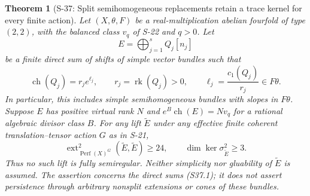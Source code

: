 \documentclass[11pt,a4paper]{article}
\newtheorem{theorem}{Theorem}[section]
\theoremstyle{definition}
\begin{document}
\begin{theorem}[S-37: Split semihomogeneous replacements retain a trace kernel for every finite action]
\label{thm:semireg-rm-split-semihomogeneous}
Let $(X,\theta,F)$ be a real-multiplication abelian
fourfold of type $(2,2)$, with the balanced class $v_q$
of S-22 and $q>0$. Let
\[
 E=\bigoplus_{j=1}^{s}Q_j[n_j]
 \tag{S37.1}
\]
be a finite direct sum of shifts of simple vector bundles
such that
\[
 \operatorname{ch}(Q_j)=r_j e^{\ell_j},\qquad
 r_j=\operatorname{rk}(Q_j)>0,\qquad
 \ell_j=\frac{c_1(Q_j)}{r_j}\in F\theta.
 \tag{S37.2}
\]
In particular, this includes simple semihomogeneous
bundles with slopes in $F\theta$. Suppose $E$ has
positive virtual rank $N$ and
$e^B\operatorname{ch}(E)=Nv_q$ for a rational algebraic
divisor class $B$.
For any lift $\widetilde E$ under any effective finite
coherent translation--tensor action $G$ as in S-21,
\[
 \operatorname{ext}^2_{\operatorname{Perf}(X)^G}
                  (\widetilde E,\widetilde E)\ge24,
 \qquad
 \dim\ker\sigma^2_{\widetilde E}\ge3.
 \tag{S37.3}
\]
Thus no such lift is fully semiregular. Neither
simplicity nor gluability of $\widetilde E$ is assumed.
The assertion concerns the direct sums (S37.1); it
does not assert persistence through arbitrary nonsplit
extensions or cones of these bundles.
\end{theorem}
\end{document}
